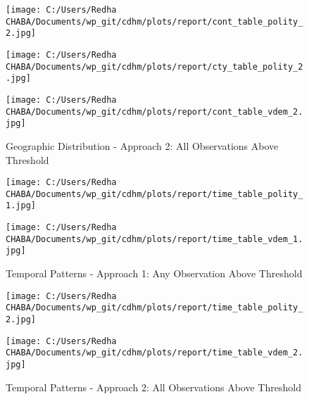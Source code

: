 \documentclass[11pt]{article}
\begin{document}
\begin{figure}[H]
    \begin{center}
    \caption{Geographic Distribution - Approach 2: All Observations Above Threshold}
    \texttt{[image: C:/Users/Redha CHABA/Documents/wp\_git/cdhm/plots/report/cont\_table\_polity\_2.jpg]}

    \vspace{1cm}

    \texttt{[image: C:/Users/Redha CHABA/Documents/wp\_git/cdhm/plots/report/cty\_table\_polity\_2.jpg]}
    
    \vspace{1cm}

    \texttt{[image: C:/Users/Redha CHABA/Documents/wp\_git/cdhm/plots/report/cont\_table\_vdem\_2.jpg]}
    \end{center}
\end{figure}

\begin{figure}[H]
    \begin{center}
    \caption{Temporal Patterns - Approach 1: Any Observation Above Threshold}
    \texttt{[image: C:/Users/Redha CHABA/Documents/wp\_git/cdhm/plots/report/time\_table\_polity\_1.jpg]}
        
    \vspace{1cm}

    \texttt{[image: C:/Users/Redha CHABA/Documents/wp\_git/cdhm/plots/report/time\_table\_vdem\_1.jpg]}
    \end{center}
\end{figure}

\begin{figure}[H]
    \begin{center}
    \caption{Temporal Patterns - Approach 2: All Observations Above Threshold}
    \texttt{[image: C:/Users/Redha CHABA/Documents/wp\_git/cdhm/plots/report/time\_table\_polity\_2.jpg]}
    
    \vspace{1cm}

    \texttt{[image: C:/Users/Redha CHABA/Documents/wp\_git/cdhm/plots/report/time\_table\_vdem\_2.jpg]}
    
    \end{center}
\end{figure}
\end{document}
